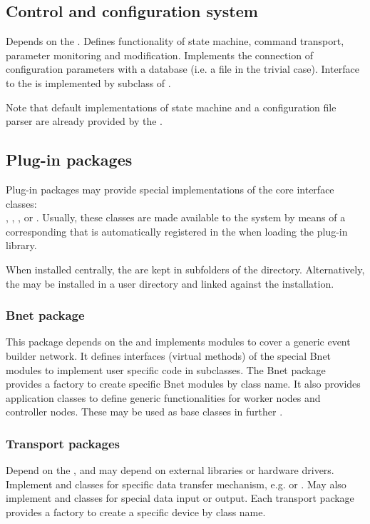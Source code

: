 \subsection{Control and configuration system}
   Depends on the . Defines 
   functionality of state machine, command transport, parameter 
   monitoring and modification. Implements the 
   connection of configuration parameters with a database 
   (i.e. a file in the trivial case). Interface to the  is 
   implemented by subclass of .
   
   Note that default implementations of state machine and a configuration file
   parser are already provided by the .

                
\subsection{Plug-in packages}
Plug-in packages may provide special implementations of the core interface classes: \\
, , , or
. Usually, these classes are made available to the system by means
of a corresponding  that is automatically registered in the  
when loading the plug-in library.

When installed centrally, the  are kept in subfolders of the   directory.
Alternatively, the  may be installed in a user directory and linked against the
 installation.

\subsubsection{Bnet package}
   This package depends on the  and implements 
   modules to cover a generic event builder network. 
   It defines interfaces (virtual methods) of the special Bnet modules to 
   implement user specific code in subclasses. The Bnet package provides a 
   factory to create specific Bnet modules by class name. It also 
   provides application classes to define generic functionalities for 
   worker nodes  and controller nodes. These may be used as base classes
   in further .
   
\subsubsection{Transport packages}
   Depend on the , and may depend on external libraries or hardware drivers. 
   Implement  and 
    classes for specific data transfer mechanism, e.g. 
    or . May also implement  
   and  classes for special data input or output. Each transport package provides a 
   factory to create a specific device by class name. 
   
